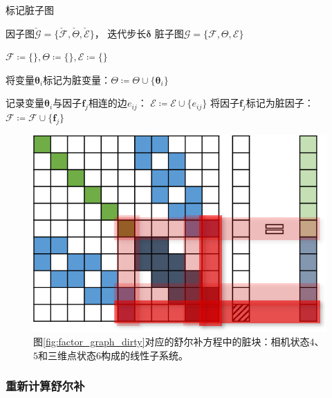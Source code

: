 \begin{algorithm}
\caption{标记脏子图}
\begin{algorithmic}[1]
    \REQUIRE 因子图$\check{\mathcal{G}}=\{\check{\mathcal{F}},\check{\Theta},\check{\mathcal{E}}\}$，
             迭代步长$\bm{\delta}$
    \ENSURE 脏子图$\mathcal{G}=\{\mathcal{F},\Theta,\mathcal{E}\}$

    \STATE $\mathcal{F}\coloneqq\{\},\Theta\coloneqq\{\},\mathcal{E}\coloneqq\{\}$

        \STATE 将变量$\bm{\theta}_i$标记为脏变量：$\Theta\coloneqq\Theta\cup\{\bm{\theta}_i\}$

        \STATE 记录变量$\bm{\theta}_i$与因子$\mathbf{f}_j$相连的边$e_{ij}$：
               $\mathcal{E} \coloneqq \mathcal{E} \cup \{e_{ij}\}$
        \STATE 将因子$\mathbf{f}_j$标记为脏因子：
               $\mathcal{F} \coloneqq \mathcal{F} \cup \{\mathbf{f}_j\}$
        \ENDFOR

    \ENDFOR
\end{algorithmic}
\label{alg:mark_dirty}
\end{algorithm}

\begin{figure}[htb!]
    \centering
    \includegraphics{figs/normal_eq_dirty.png}
    \caption{图\ref{fig:factor_graph_dirty}对应的舒尔补方程中的脏块：相机状态$4$、$5$和三维点状态$6$构成的线性子系统。}
    \label{fig:normal_eq_dirty}
\end{figure}

\subsubsection*{重新计算舒尔补}

